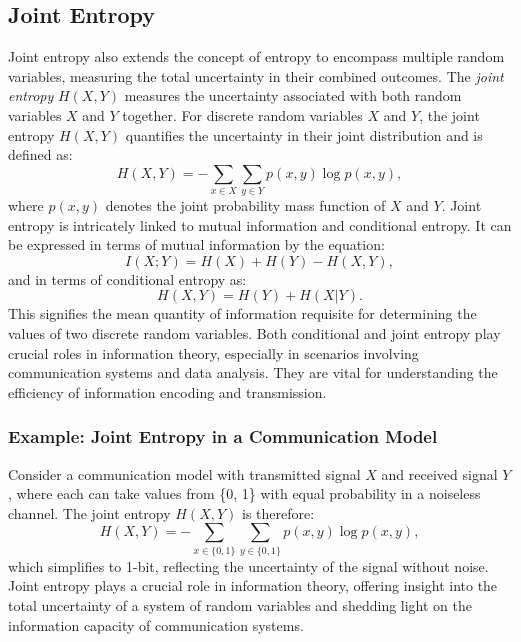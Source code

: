 \documentclass[12pt]{article}
\begin{document}
		\subsection{Joint Entropy}
		Joint entropy also extends the concept of entropy to encompass multiple random variables, measuring the total uncertainty in their combined outcomes. The \emph{joint entropy} \(H(X, Y)\) measures the uncertainty associated with both random variables \(X\) and \(Y\) together. For discrete random variables \(X\) and \(Y\), the joint entropy \(H(X, Y)\) quantifies the uncertainty in their joint distribution and is defined as:
		\begin{equation}
			H(X, Y) = -\sum_{x \in X}\sum_{y \in Y} p(x, y) \log p(x, y),
		\end{equation}
		where \(p(x, y)\) denotes the joint probability mass function of \(X\) and \(Y\). Joint entropy is intricately linked to mutual information and conditional entropy. It can be expressed in terms of mutual information by the equation:
		\begin{equation}
			I(X; Y) = H(X) + H(Y) - H(X, Y),
		\end{equation}
		and in terms of conditional entropy as:
		\begin{equation}
			H(X, Y) = H(Y) + H(X|Y).
		\end{equation}
		This signifies the mean quantity of information requisite for determining the values of two discrete random variables.
		Both conditional and joint entropy play crucial roles in information theory, especially in scenarios involving communication systems and data analysis. They are vital for understanding the efficiency of information encoding and transmission.
		\subsubsection*{Example: Joint Entropy in a Communication Model}
		Consider a communication model with transmitted signal \(X\) and received signal \(Y\), where each can take values from \{0, 1\} with equal probability in a noiseless channel. The joint entropy \(H(X, Y)\) is therefore:
		\begin{equation}
			H(X, Y) = -\sum_{x \in \{0,1\}}\sum_{y \in \{0,1\}} p(x, y) \log p(x, y),
		\end{equation}
		which simplifies to 1-bit, reflecting the uncertainty of the signal without noise. Joint entropy plays a crucial role in information theory, offering insight into the total uncertainty of a system of random variables and shedding light on the information capacity of communication systems.
		
\end{document}
